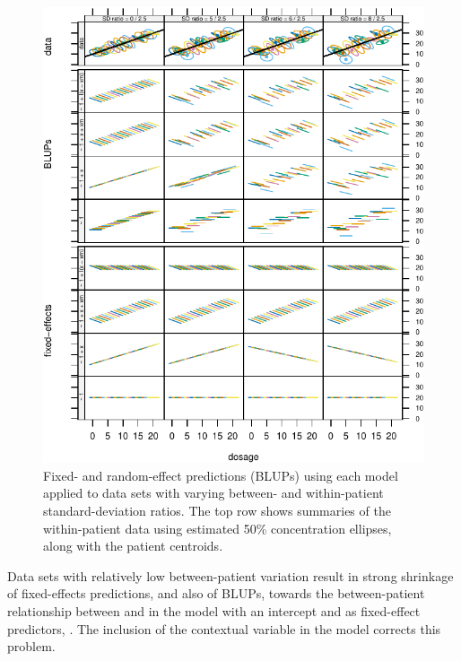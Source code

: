 \documentclass[
]{jss}
\begin{document}
\begin{CodeChunk}
\begin{figure}

{\centering \includegraphics[width=1\linewidth]{Figures/plot-fits-combined-1}

}

\caption[Fixed- and random-effect predictions (BLUPs) using each model applied to data sets with varying between- and within-patient standard-deviation ratios]{Fixed- and random-effect predictions (BLUPs) using each model applied to data sets with varying between- and within-patient standard-deviation ratios. The top row shows summaries of the within-patient data using estimated 50\% concentration ellipses, along with the patient centroids.}\label{fig:plot-fits-combined}
\end{figure}
\end{CodeChunk}

Data sets with relatively low between-patient variation result in strong
shrinkage of fixed-effects predictions, and also of BLUPs, towards the
between-patient relationship between  and  in the model
with an intercept and  as fixed-effect predictors,
. The inclusion of the contextual variable  in
the model corrects this problem.
\end{document}
